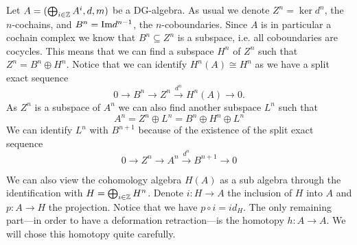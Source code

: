 Let $A=(\bigoplus_{i\in \mathbb{Z}}A^i, d, m)$ be a DG-algebra. As usual we denote $Z^n = \ker d^n$, the $n$-cochains,  and $B^n = \text{Im} d^{n-1}$, the $n$-coboundaries. Since $A$ is in particular a cochain complex we know that $B^n\subseteq Z^n$ is a subspace, i.e. all coboundaries are cocycles. This means that we can find a subspace $H^n$ of $Z^n$ such that $Z^n = B^n\oplus H^n$. Notice that we can identify $H^n(A)\cong H^n$ as we have a split exact sequence
\begin{equation*}
    0\longrightarrow B^n\longrightarrow Z^n\overset{d^n}\longrightarrow H^n(A)\longrightarrow 0 .
\end{equation*}
As $Z^n$ is a subspace of $A^n$ we can also find another subspace $L^n$ such that 
\begin{equation*}
    A^n = Z^n\oplus L^n = B^n\oplus H^n\oplus L^n
\end{equation*}
We can identify $L^n$ with $B^{n+1}$ because of the existence of the split exact sequence 
\begin{equation*}
    0\longrightarrow Z^n\longrightarrow A^n\overset{d^n}\longrightarrow B^{n+1}\longrightarrow 0
\end{equation*}

We can also view the cohomology algebra $H(A)$ as a sub algebra through the identification with $H=\bigoplus_{i\in \mathbb{Z}} H^n$. Denote $i\colon H\longrightarrow A$ the inclusion of $H$ into $A$ and $p\colon A\longrightarrow H$ the projection. Notice that we have $p\circ i = id_H$. The only remaining part---in order to have a deformation retraction---is the homotopy $h\colon A\longrightarrow A$. We will chose this homotopy quite carefully. 

